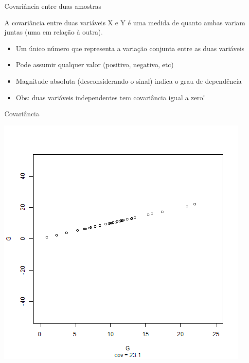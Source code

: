 \documentclass{beamer}
\begin{document}
\begin{frame}{Covariância entre duas amostras}
  \begin{definition}
    A covariância entre duas variáveis X e Y é uma medida de quanto
    ambas variam juntas (uma em relação à outra).
  \end{definition}
  \begin{itemize}
  \item Um único número que representa a variação conjunta entre as duas variáveis
  \item Pode assumir qualquer valor (positivo, negativo, etc)
  \item Magnitude absoluta (desconsiderando o sinal) indica o grau de dependência
  \item Obs: duas variáveis independentes tem covariância igual a zero!
  \end{itemize}
\end{frame}

\begin{frame}{Covariância}
  \begin{center}
    \includegraphics[height=.8\textheight]{Cap17/anim-0}
  \end{center}
\end{frame}
\end{document}
